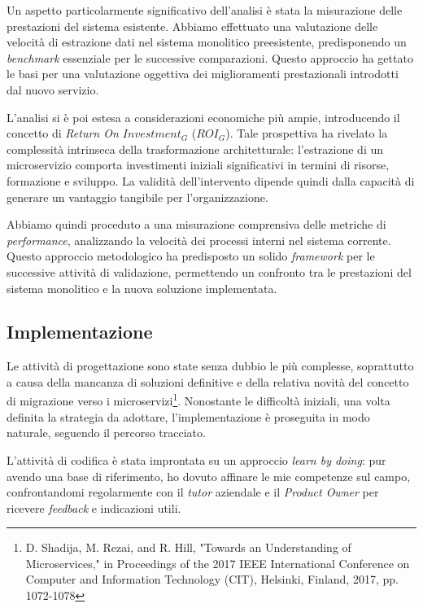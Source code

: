         \vspace{0.2 em}
        \noindent Un aspetto particolarmente significativo dell'analisi è stata la misurazione delle prestazioni del sistema esistente. Abbiamo effettuato una valutazione delle velocità di estrazione dati nel sistema monolitico preesistente, predisponendo un \textit{benchmark} essenziale per le successive comparazioni. Questo approccio ha gettato le basi per una valutazione oggettiva dei miglioramenti prestazionali introdotti dal nuovo servizio.

        \vspace{0.2 em}
        \noindent L'analisi si è poi estesa a considerazioni economiche più ampie, introducendo il concetto di \textit{Return On $Investment_G$} ($ROI_G$). Tale prospettiva ha rivelato la complessità intrinseca della trasformazione architetturale: l'estrazione di un microservizio comporta investimenti iniziali significativi in termini di risorse, formazione e sviluppo. La validità dell'intervento dipende quindi dalla capacità di generare un vantaggio tangibile per l'organizzazione.

        \vspace{0.2 em}
        \noindent Abbiamo quindi proceduto a una misurazione comprensiva delle metriche di \textit{performance}, analizzando la velocità dei processi interni nel sistema corrente. Questo approccio metodologico ha predisposto un solido \textit{framework} per le successive attività di validazione, permettendo un confronto tra le prestazioni del sistema monolitico e la nuova soluzione implementata.

        
        \subsection{Implementazione}
        Le attività di progettazione sono state senza dubbio le più complesse, soprattutto a causa della mancanza di soluzioni definitive e della relativa novità del concetto di migrazione verso i microservizi\footnote{D. Shadija, M. Rezai, and R. Hill, "Towards an Understanding of Microservices," in Proceedings of the 2017 IEEE International Conference on Computer and Information Technology (CIT), Helsinki, Finland, 2017, pp. 1072-1078}. Nonostante le difficoltà iniziali, una volta definita la strategia da adottare, l'implementazione è proseguita in modo naturale, seguendo il percorso tracciato.  

        \vspace{0.2 em}
        \noindent L'attività di codifica è stata improntata su un approccio \textit{learn by doing}: pur avendo una base di riferimento, ho dovuto affinare le mie competenze sul campo, confrontandomi regolarmente con il \textit{tutor} aziendale e il \textit{Product Owner} per ricevere \textit{feedback} e indicazioni utili.
        
